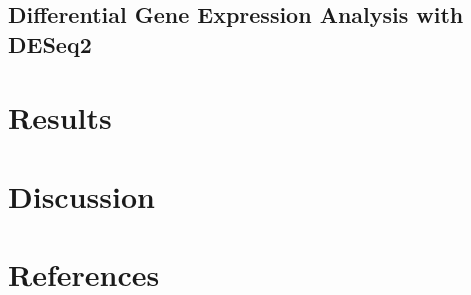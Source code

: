 \documentclass[10pt]{article}
\begin{document}
	\subsection{Differential Gene Expression Analysis with DESeq2}


\section{Results}



\section{Discussion}





\clearpage\newpage
\section{References}
\end{document}
